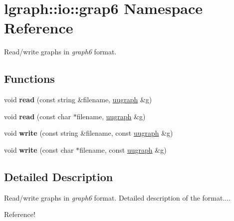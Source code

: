 \hypertarget{namespacelgraph_1_1io_1_1grap6}{\section{lgraph\-:\-:io\-:\-:grap6 Namespace Reference}
\label{namespacelgraph_1_1io_1_1grap6}
}


Read/write graphs in {\itshape graph6} format.  


\subsection*{Functions}
\begin{DoxyCompactItemize}
\item 
\hypertarget{namespacelgraph_1_1io_1_1grap6_ab7d54f76c250af0eb983dd290dd774f0}{void {\bfseries read} (const string \&filename, \hyperlink{classlgraph_1_1utils_1_1uugraph}{uugraph} \&g)}\label{namespacelgraph_1_1io_1_1grap6_ab7d54f76c250af0eb983dd290dd774f0}

\item 
\hypertarget{namespacelgraph_1_1io_1_1grap6_af2e612951549511d95be6900f5b77d71}{void {\bfseries read} (const char $\ast$filename, \hyperlink{classlgraph_1_1utils_1_1uugraph}{uugraph} \&g)}\label{namespacelgraph_1_1io_1_1grap6_af2e612951549511d95be6900f5b77d71}

\item 
\hypertarget{namespacelgraph_1_1io_1_1grap6_a3c369970870b0edf864ae02365c06b0f}{void {\bfseries write} (const string \&filename, const \hyperlink{classlgraph_1_1utils_1_1uugraph}{uugraph} \&g)}\label{namespacelgraph_1_1io_1_1grap6_a3c369970870b0edf864ae02365c06b0f}

\item 
\hypertarget{namespacelgraph_1_1io_1_1grap6_ad3cfb43a4e8190962b88c8e1232c7fe7}{void {\bfseries write} (const char $\ast$filename, const \hyperlink{classlgraph_1_1utils_1_1uugraph}{uugraph} \&g)}\label{namespacelgraph_1_1io_1_1grap6_ad3cfb43a4e8190962b88c8e1232c7fe7}

\end{DoxyCompactItemize}


\subsection{Detailed Description}
Read/write graphs in {\itshape graph6} format. Detailed description of the format....

Reference! 